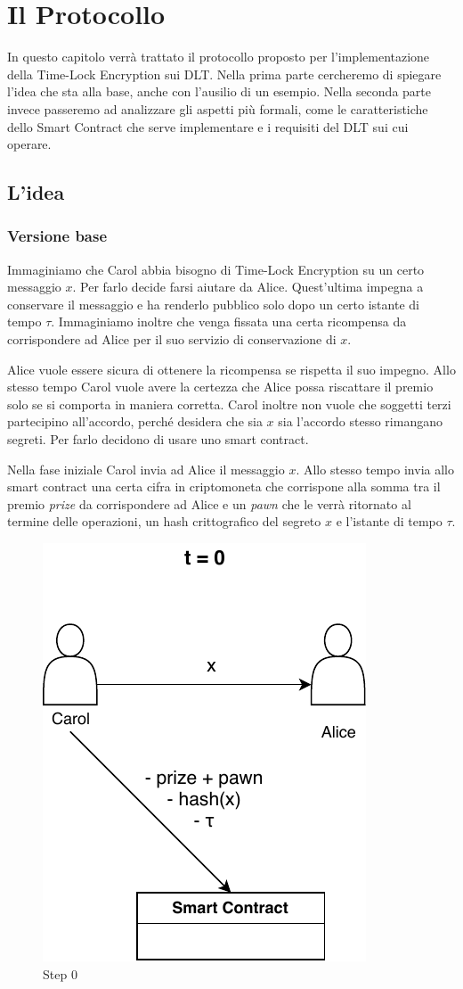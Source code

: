 \chapter{Il Protocollo}

In questo capitolo verrà trattato il protocollo proposto per l'implementazione
della Time-Lock Encryption sui DLT. Nella prima parte cercheremo di spiegare
l'idea che sta alla base, anche con l'ausilio di un esempio. Nella seconda parte
invece passeremo ad analizzare gli aspetti più formali, come le caratteristiche
dello Smart Contract che
serve implementare e i requisiti del DLT sui cui operare.

\section{L'idea}
\subsection{Versione base}
Immaginiamo che Carol abbia bisogno di Time-Lock Encryption su un certo messaggio $ x $.
Per farlo decide farsi aiutare da Alice. Quest'ultima
impegna a conservare il messaggio e ha renderlo pubblico solo dopo un
certo istante di tempo $ \tau $.
Immaginiamo inoltre che venga fissata una certa ricompensa da corrispondere ad Alice
per il suo servizio di conservazione di $ x $.

Alice vuole essere sicura di
ottenere la ricompensa se rispetta il suo impegno. Allo stesso tempo Carol
vuole avere la certezza che Alice possa riscattare il premio solo se si comporta
in maniera corretta.
Carol inoltre non vuole che soggetti terzi partecipino all'accordo, perché desidera
che sia $ x $ sia l'accordo stesso rimangano segreti.
Per farlo decidono di usare uno smart contract.

Nella fase iniziale Carol invia ad Alice il messaggio $ x $. Allo stesso tempo invia
allo smart contract una certa cifra in criptomoneta
che corrispone alla somma tra il premio \textit{prize} da corrispondere ad Alice e un
\textit{pawn} che le verrà ritornato al termine delle operazioni, un hash
crittografico del segreto $ x $ e l'istante di tempo $ \tau $.
\begin{figure}[H]
	\centering
	\includegraphics[width=0.3\linewidth]{images/chap_protocollo/step-0.pdf}
	\caption{Step 0}
\end{figure}


